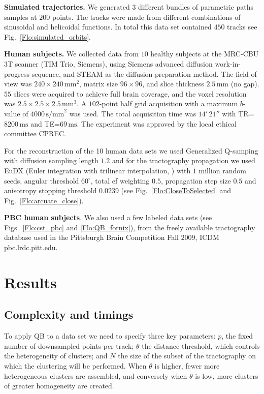 \documentclass[preprint,authoryear,a4paper,10pt,onecolumn]{elsarticle}
\begin{document}
\textbf{Simulated trajectories.} We generated $3$ different bundles of
parametric paths samples at $200$ points. The tracks were made from
different combinations of sinusoidal and helicoidal functions.  In total
this data set contained $450$ tracks see Fig.~\ref{Flo:simulated_orbits}.

\textbf{Human subjects.} We collected data from $10$ healthy subjects at
the MRC-CBU 3T scanner (TIM Trio, Siemens), using Siemens advanced
diffusion work-in-progress sequence, and STEAM
\citep{merboldt1992diffusion,MAB04} as the diffusion preparation
method. The field of view was $240\times240\,\textrm{mm}^{2}$, matrix size
$96\times96$, and slice thickness $2.5\,\textrm{mm}$ (no gap).  $55$ slices were
acquired to achieve full brain coverage, and the voxel resolution was
$2.5\times2.5\times2.5\,\textrm{mm}^{3}$. A $102$-point half grid
acquisition \citep{Yeh2010} with a maximum $b$-value of $4000\, \textrm{s/mm}^{2}$
was used. The total acquisition time was $14'\,21''$ with
TR=$8200\,\textrm{ms}$ and TE=$69\,\textrm{ms}$. The experiment was approved
by the local ethical committee CPREC.

For the reconstruction of the 10 human data sets we used Generalized
Q-samping \citep{Garyfallidis_thesis} with diffusion sampling length
$1.2$ and for the tractography propagation we used EuDX (Euler
integration with trilinear interpolation, \citet{Garyfallidis_thesis})
with $1$ million random seeds, angular threshold $60^{\circ}$, total
ef weighting $0.5$, propagation step size $0.5$ and anisotropy stopping
threshold $0.0239$ (see Fig.~\ref{Flo:CloseToSelected} 
and Fig.~\ref{Flo:arcuate_close}).

\textbf{PBC human subjects}. We also used a few labeled data sets (see
Figs.~\ref{Flo:cst_pbc} and \ref{Flo:QB_fornix}), from the freely available
tractography database used in the Pittsburgh Brain Competition Fall
$2009$, ICDM pbc.lrdc.pitt.edu.

\section{Results}

\subsection{Complexity and timings\label{sub:Complexity}}

To apply QB to a data set we need to specify three key parameters:
$p$, the fixed number of downsampled points per track; $\theta$
the distance threshold, which controls the heterogeneity of clusters;
and $N$ the size of the subset of the tractography on which the clustering
will be performed. When $\theta$ is higher, fewer more heterogeneous
clusters are assembled, and conversely when $\theta$ is low, more
clusters of greater homogeneity are created.
\end{document}
